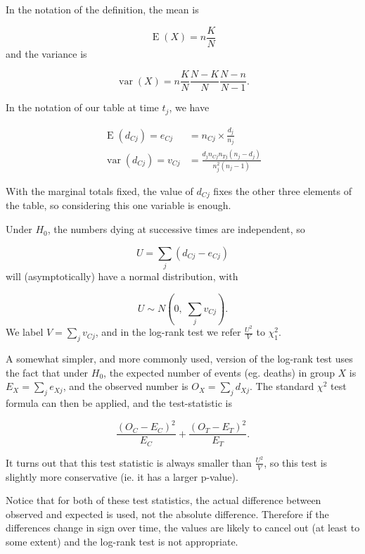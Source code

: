 \documentclass[
  openany]{book}
\theoremstyle{definition}
\theoremstyle{definition}
\theoremstyle{definition}
\theoremstyle{definition}
\theoremstyle{remark}
\begin{document}
In the notation of the definition, the mean is

\[\operatorname{E}\left(X\right)= n\frac{K}{N} \]
and the variance is

\[\operatorname{var}\left(X\right) = n\frac{K}{N}\frac{N-K}{N}\frac{N-n}{N-1}.\]

In the notation of our table at time \(t_j\), we have

\begin{align*}
\operatorname{E}\left(d_{Cj}\right) = e_{Cj} & = n_{Cj}\times{\frac{d_j}{n_j}}\\
\operatorname{var}\left(d_{Cj}\right) = v_{Cj} &= \frac{d_j n_{Cj}n_{Tj} \left(n_j-d_j\right)}{n_j^2\left(n_j-1\right)}
\end{align*}

With the marginal totals fixed, the value of \(d_{Cj}\) fixes the other three elements of the table, so considering this one variable is enough.

Under \(H_0\), the numbers dying at successive times are independent, so

\[U = \sum\limits_{j}\left(d_{Cj}-e_{Cj}\right) \]
will (asymptotically) have a normal distribution, with

\[U \sim {N}\left(0,\;\sum\limits_j v_{Cj}\right). \]
We label \(V = \sum\limits_jv_{Cj}\), and in the log-rank test we refer \(\frac{U^2}{V}\) to \(\chi^2_1\).

A somewhat simpler, and more commonly used, version of the log-rank test uses the fact that under \(H_0\), the expected number of events (eg. deaths) in group \(X\) is \(E_X = \sum\limits_je_{Xj}\), and the observed number is \(O_X = \sum\limits_j d_{Xj}\). The standard \(\chi^2\) test formula can then be applied, and the test-statistic is

\[\frac{\left(O_C - E_C\right)^2}{E_C} + \frac{\left(O_T - E_T\right)^2}{E_T}.\]

It turns out that this test statistic is always smaller than \(\frac{U^2}{V}\), so this test is slightly more conservative (ie. it has a larger p-value).

Notice that for both of these test statistics, the actual difference between observed and expected is used, not the absolute difference. Therefore if the differences change in sign over time, the values are likely to cancel out (at least to some extent) and the log-rank test is not appropriate.
\end{document}

